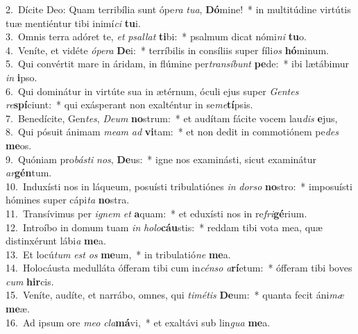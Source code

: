 {2.~}Dícite Deo: Quam terribília sunt ópe\textit{ra} \textit{tu}\textit{a}, \textbf{Dó}mine!~* in multitúdine virtútis tuæ mentiéntur tibi inimí\textit{ci} \textbf{tu}i.\\
{3.~}Omnis terra adóret te, \textit{et} \textit{psal}\textit{lat} \textbf{ti}bi:~* psalmum dicat nómi\textit{ni} \textbf{tu}o.\\
{4.~}Veníte, et vidéte \textit{ó}\textit{pe}\textit{ra} \textbf{De}i:~* terríbilis in consíliis super fíli\textit{os} \textbf{hó}minum.\\
{5.~}Qui convértit mare in áridam, in flúmine per\textit{tran}\textit{sí}\textit{bunt} \textbf{pe}de:~* ibi lætábimur \textit{in} \textbf{i}pso.\\
{6.~}Qui dominátur in virtúte sua in ætérnum, óculi ejus super \textit{Gen}\textit{tes} \textit{re}\textbf{spí}ciunt:~* qui exásperant non exalténtur in se\textit{me}\textbf{tí}psis.\\
{7.~}Benedícite, Gen\textit{tes}, \textit{De}\textit{um} \textbf{no}strum:~* et audítam fácite vocem lau\textit{dis} \textbf{e}jus,\\
{8.~}Qui pósuit ánimam \textit{me}\textit{am} \textit{ad} \textbf{vi}tam:~* et non dedit in commotiónem pe\textit{des} \textbf{me}os.\\
{9.~}Quóniam pro\textit{bá}\textit{sti} \textit{nos}, \textbf{De}us:~* igne nos examinásti, sicut examinátur \textit{ar}\textbf{gén}tum.\\
{10.~}Induxísti nos in láqueum, posuísti tribulatiónes \textit{in} \textit{dor}\textit{so} \textbf{no}stro:~* imposuísti hómines super cápi\textit{ta} \textbf{no}stra.\\
{11.~}Transívimus per \textit{i}\textit{gnem} \textit{et} \textbf{a}quam:~* et eduxísti nos in re\textit{fri}\textbf{gé}rium.\\
{12.~}Introíbo in domum tuam \textit{in} \textit{ho}\textit{lo}\textbf{cáu}stis:~* reddam tibi vota mea, quæ distinxérunt lábi\textit{a} \textbf{me}a.\\
{13.~}Et locú\textit{tum} \textit{est} \textit{os} \textbf{me}um,~* in tribulatió\textit{ne} \textbf{me}a.\\
{14.~}Holocáusta medulláta ófferam tibi cum in\textit{cén}\textit{so} \textit{a}\textbf{rí}etum:~* ófferam tibi boves \textit{cum} \textbf{hir}cis.\\
{15.~}Veníte, audíte, et narrábo, omnes, qui \textit{ti}\textit{mé}\textit{tis} \textbf{De}um:~* quanta fecit áni\textit{mæ} \textbf{me}æ.\\
{16.~}Ad ipsum ore \textit{me}\textit{o} \textit{cla}\textbf{má}vi,~* et exaltávi sub lin\textit{gua} \textbf{me}a.\\
